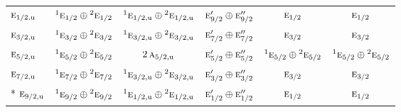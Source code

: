 \documentclass[10pt,a4paper]{article}
\numberwithin{equation}{section}
\newcommand{\irr}[1]{\text{\normalfont\scshape #1}}
\newcommand{\conjpair}[1]{{}^{#1}}
\newcommand{\ptag}[1]{\mathrm{#1}}
\begin{document}
{\begin{longtable}{@{}lccccc@{}}
$\irr{e}_{1/2,\ptag{u}}$ & $\conjpair{1}\irr{e}_{1/2}\oplus \conjpair{2}\irr{e}_{1/2}$ & $\conjpair{1}\irr{e}_{1/2,\ptag{u}}\oplus \conjpair{2}\irr{e}_{1/2,\ptag{u}}$ & $\irr{e}_{9/2}'\oplus \irr{e}_{9/2}''$ & $\irr{e}_{1/2}$ & $\irr{e}_{1/2}$\\
$\irr{e}_{3/2,\ptag{u}}$ & $\conjpair{1}\irr{e}_{3/2}\oplus \conjpair{2}\irr{e}_{3/2}$ & $\conjpair{1}\irr{e}_{3/2,\ptag{u}}\oplus \conjpair{2}\irr{e}_{3/2,\ptag{u}}$ & $\irr{e}_{7/2}'\oplus \irr{e}_{7/2}''$ & $\irr{e}_{3/2}$ & $\irr{e}_{3/2}$\\
$\irr{e}_{5/2,\ptag{u}}$ & $\conjpair{1}\irr{e}_{5/2}\oplus \conjpair{2}\irr{e}_{5/2}$ & $2\,\irr{a}_{5/2,\ptag{u}}$ & $\irr{e}_{5/2}'\oplus \irr{e}_{5/2}''$ & $\conjpair{1}\irr{e}_{5/2}\oplus \conjpair{2}\irr{e}_{5/2}$ & $\conjpair{1}\irr{e}_{5/2}\oplus \conjpair{2}\irr{e}_{5/2}$\\
$\irr{e}_{7/2,\ptag{u}}$ & $\conjpair{1}\irr{e}_{7/2}\oplus \conjpair{2}\irr{e}_{7/2}$ & $\conjpair{1}\irr{e}_{3/2,\ptag{u}}\oplus \conjpair{2}\irr{e}_{3/2,\ptag{u}}$ & $\irr{e}_{3/2}'\oplus \irr{e}_{3/2}''$ & $\irr{e}_{3/2}$ & $\irr{e}_{3/2}$\\*
$\irr{e}_{9/2,\ptag{u}}$ & $\conjpair{1}\irr{e}_{9/2}\oplus \conjpair{2}\irr{e}_{9/2}$ & $\conjpair{1}\irr{e}_{1/2,\ptag{u}}\oplus \conjpair{2}\irr{e}_{1/2,\ptag{u}}$ & $\irr{e}_{1/2}'\oplus \irr{e}_{1/2}''$ & $\irr{e}_{1/2}$ & $\irr{e}_{1/2}$\\
\bottomrule\end{longtable}}
\end{document}
